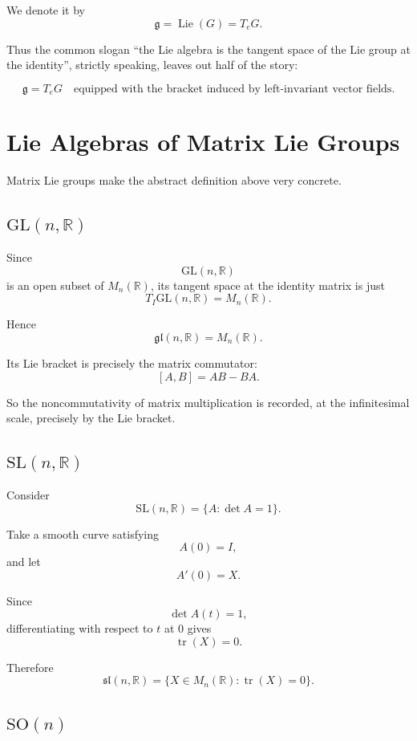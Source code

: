 \documentclass[11pt]{article}
\begin{document}
We denote it by
\[
\mathfrak g
=
\operatorname{Lie}(G)
=
T_eG.
\]

Thus the common slogan ``the Lie algebra is the tangent space of the Lie group at the identity'', strictly speaking, leaves out half of the story:

\[
\boxed{
\mathfrak g=T_eG
\quad
\text{equipped with the bracket induced by left-invariant vector fields.}
}
\]


\section{Lie Algebras of Matrix Lie Groups}

Matrix Lie groups make the abstract definition above very concrete.

\subsection{$\mathrm{GL}(n,\mathbb{R})$}

Since
\[
\mathrm{GL}(n,\mathbb{R})
\]
is an open subset of $M_n(\mathbb{R})$, its tangent space at the identity matrix is just
\[
T_I\mathrm{GL}(n,\mathbb{R})
=
M_n(\mathbb{R}).
\]

Hence
\[
\mathfrak{gl}(n,\mathbb{R})
=
M_n(\mathbb{R}).
\]

Its Lie bracket is precisely the matrix commutator:
\[
[A,B]
=
AB-BA.
\]

So the noncommutativity of matrix multiplication is recorded, at the infinitesimal scale, precisely by the Lie bracket.


\subsection{$\mathrm{SL}(n,\mathbb{R})$}

Consider
\[
\mathrm{SL}(n,\mathbb{R})
=
\{A:\det A=1\}.
\]

Take a smooth curve satisfying
\[
A(0)=I,
\]
and let
\[
A'(0)=X.
\]

Since
\[
\det A(t)=1,
\]
differentiating with respect to $t$ at $0$ gives
\[
\operatorname{tr}(X)=0.
\]

Therefore
\[
\mathfrak{sl}(n,\mathbb{R})
=
\{X\in M_n(\mathbb{R}):\operatorname{tr}(X)=0\}.
\]


\subsection{$\mathrm{SO}(n)$}
\end{document}
